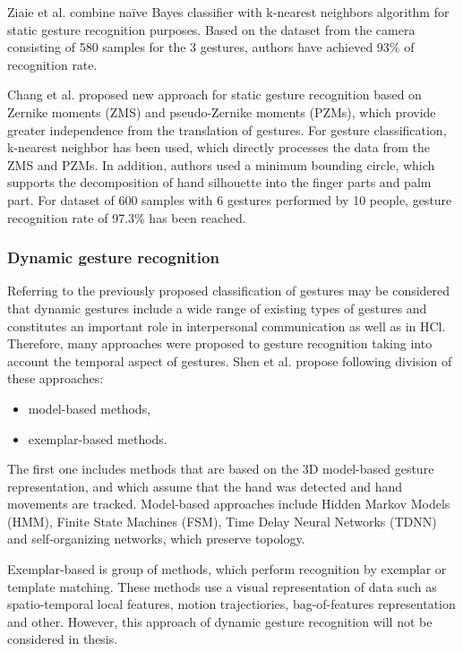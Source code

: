 Ziaie et al. \cite{ziaie-etal-csicc2008-revised} combine naïve Bayes classifier with k-nearest neighbors algorithm for static gesture recognition purposes. Based on the dataset from the camera consisting of 580 samples for the 3 gestures, authors have achieved 93\% of recognition rate.

Chang et al. \cite{journals/jise/ChangCTH06} proposed new approach for static gesture recognition based on Zernike moments (ZMS) and pseudo-Zernike moments (PZMs), which provide greater independence from the translation of gestures. For gesture classification, k-nearest neighbor has been used, which directly processes the data from the ZMS and PZMs. In addition, authors used a minimum bounding circle, which supports the decomposition of hand silhouette into the finger parts and palm part. For dataset of 600 samples with 6 gestures performed by 10 people, gesture recognition rate of 97.3\% has been reached.

\subsubsection{Dynamic gesture recognition}

Referring to the previously proposed classification of gestures may be considered that dynamic gestures include a wide range of existing types of gestures and constitutes an important role in interpersonal communication as well as in HCl. Therefore, many approaches were proposed to gesture recognition taking into account the temporal aspect of gestures. Shen et al. \cite{Shen:2012:DHG:2206425.2206457} propose following division of these approaches:

\begin{itemize}
\item model-based methods,
\item exemplar-based methods.
\end{itemize}

The first one includes methods that are based on the 3D model-based gesture representation, and which assume that the hand was detected and hand movements are tracked. Model-based approaches include Hidden Markov Models (HMM), Finite State Machines (FSM), Time Delay Neural Networks (TDNN) and self-organizing networks, which preserve topology.

Exemplar-based is group of methods, which perform recognition by exemplar or template matching. These methods use a visual representation of data such as spatio-temporal local features, motion trajectiories, bag-of-features representation and other. However, this approach of dynamic gesture recognition will not be considered in thesis.



